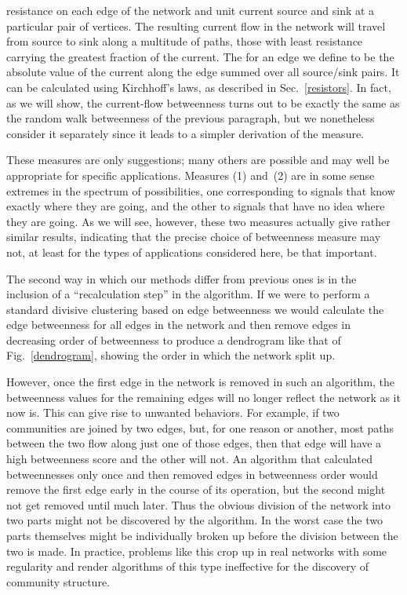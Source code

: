 \documentclass[twocolumn,pre,superscriptaddress]{revtex4}
\begin{document}
\begin{enumerate}
resistance on each edge of the network and unit current source and sink at
a particular pair of vertices.  The resulting current flow in the network
will travel from source to sink along a multitude of paths, those with
least resistance carrying the greatest fraction of the current.  The
 for an edge we define to be the absolute
value of the current along the edge summed over all source/sink pairs.  It
can be calculated using Kirchhoff's laws, as described in
Sec.~\ref{resistors}.  In fact, as we will show, the current-flow
betweenness turns out to be exactly the same as the random walk betweenness
of the previous paragraph, but we nonetheless consider it separately since
it leads to a simpler derivation of the measure.
\end{enumerate}

These measures are only suggestions; many others are possible and may well
be appropriate for specific applications.  Measures (1) and~(2) are in some
sense extremes in the spectrum of possibilities, one corresponding to
signals that know exactly where they are going, and the other to signals
that have no idea where they are going.  As we will see, however, these two
measures actually give rather similar results, indicating that the precise
choice of betweenness measure may not, at least for the types of
applications considered here, be that important.

The second way in which our methods differ from previous ones is in the
inclusion of a ``recalculation step'' in the algorithm.  If we were to
perform a standard divisive clustering based on edge betweenness we would
calculate the edge betweenness for all edges in the network and then remove
edges in decreasing order of betweenness to produce a dendrogram like that
of Fig.~\ref{dendrogram}, showing the order in which the network split up.

However, once the first edge in the network is removed in such an
algorithm, the betweenness values for the remaining edges will no longer
reflect the network as it now is.  This can give rise to unwanted
behaviors.  For example, if two communities are joined by two edges, but,
for one reason or another, most paths between the two flow along just one
of those edges, then that edge will have a high betweenness score and the
other will not.  An algorithm that calculated betweennesses only once and
then removed edges in betweenness order would remove the first edge early
in the course of its operation, but the second might not get removed until
much later.  Thus the obvious division of the network into two parts might
not be discovered by the algorithm.  In the worst case the two parts
themselves might be individually broken up before the division between the
two is made.  In practice, problems like this crop up in real networks with
some regularity and render algorithms of this type ineffective for the
discovery of community structure.
\end{document}
